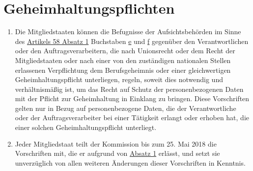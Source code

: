 \chapter{Geheimhaltungspflichten}
\label{ch:90}


\begin{enumerate}

  \item Die Mitgliedstaaten können die Befugnisse der Aufsichtsbehörden im Sinne des \hyperref[itm:58-1]{Artikels 58
   Absatz 1} Buchstaben \hyperref[itm:58-1e]{e} und \hyperref[itm:58-1f]{f} gegenüber den Verantwortlichen oder den
   Auftragsverarbeitern, die nach Unionsrecht oder dem Recht der Mitgliedstaaten oder nach einer von den zuständigen
   nationalen Stellen erlassenen Verpflichtung dem Berufsgeheimnis oder einer gleichwertigen Geheimhaltungspflicht
   unterliegen, regeln, soweit dies notwendig und verhältnismäßig ist, um das Recht auf Schutz der personenbezogenen
   Daten mit der Pflicht zur Geheimhaltung in Einklang zu bringen. Diese Vorschriften gelten nur in Bezug auf
   personenbezogene Daten, die der Verantwortliche oder der Auftragsverarbeiter bei einer Tätigkeit erlangt oder
   erhoben hat, die einer solchen Geheimhaltungspflicht unterliegt.
  \label{itm:90-1}

  \item Jeder Mitgliedstaat teilt der Kommission bis zum 25. Mai 2018 die Vorschriften mit, die er aufgrund von
   \hyperref[itm:90-1]{Absatz 1} erlässt, und setzt sie unverzüglich von allen weiteren Änderungen dieser Vorschriften
    in Kenntnis.
  \label{itm:90-2}

\end{enumerate}


